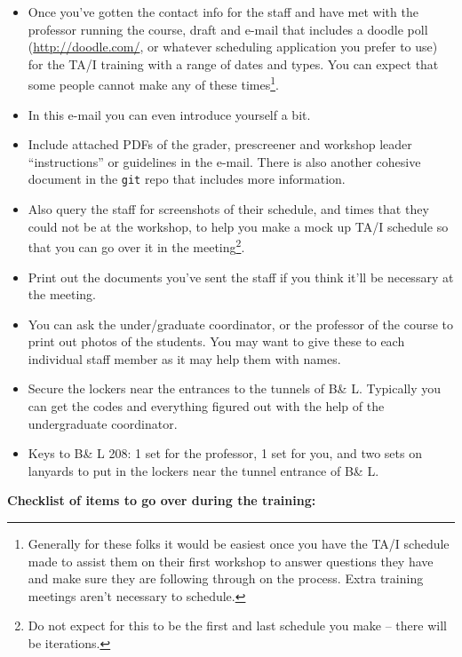 \documentclass[12pt]{article}
\begin{document}
\begin{itemize}
	\item Once you've gotten the contact info for the staff and have met with the professor running the course, draft and e-mail that includes a doodle poll (\url{http://doodle.com/}, or whatever scheduling application you prefer to use) for the TA/I training with a range of dates and types. You can expect that some people cannot make any of these times\footnote{Generally for these folks it would be easiest once you have the TA/I schedule made to assist them on their first workshop to answer questions they have and make sure they are following through on the process. Extra training meetings aren't necessary to schedule.}.
	\item In this e-mail you can even introduce yourself a bit. 
	\item Include attached PDFs of the grader, prescreener and workshop leader ``instructions'' or guidelines in the e-mail. There is also another cohesive document in the \texttt{git} repo that includes more information.
	\item Also query the staff for screenshots of their schedule, and times that they could not be at the workshop, to help you make a mock up TA/I schedule so that you can go over it in the meeting\footnote{Do not expect for this to be the first and last schedule you make -- there will be iterations.}.
	\item Print out the documents you've sent the staff if you think it'll be necessary at the meeting.
	\item You can ask the under/graduate coordinator, or the professor of the course to print out photos of the students. You may want to give these to each individual staff member as it may help them with names.
	\item Secure the lockers near the entrances to the tunnels of B\& L. Typically you can get the codes and everything figured out with the help of the undergraduate coordinator. 
	\item Keys to B\& L 208: 1 set for the professor, 1 set for you, and two sets on lanyards to put in the lockers near the tunnel entrance of B\& L.
\end{itemize}

\noindent \textbf{Checklist of items to go over during the training:}
\end{document}
